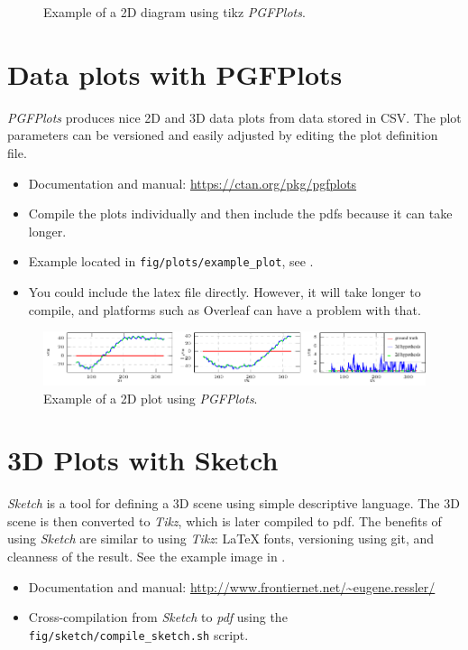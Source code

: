 \begin{figure}[htbp]
  \centering

  \begin{adjustbox}{max totalsize={0.6\textwidth}{0.90\textheight}, center}
    
  \end{adjustbox}

  \caption{Example of a 2D diagram using tikz \emph{PGFPlots}.}
  \label{fig:pgfplots_diagram}
\end{figure}

\section{Data plots with PGFPlots}

\emph{PGFPlots} produces nice 2D and 3D data plots from data stored in CSV.
The plot parameters can be versioned and easily adjusted by editing the plot definition file.
\begin{itemize}
  \item Documentation and manual: \url{https://ctan.org/pkg/pgfplots}
  \item Compile the plots individually and then include the pdfs because it can take longer.
  \item Example located in \texttt{fig/plots/example\_plot}, see .
  \item You could include the latex file directly. However, it will take longer to compile, and platforms such as Overleaf can have a problem with that.
\end{itemize}

\begin{figure}[htbp]
  \centering
  \includegraphics[width=1.0\textwidth]{./fig/plots/example_plot/hypotheses.pdf}
  \caption{Example of a 2D plot using \emph{PGFPlots}.}
  \label{fig:pgfplots_data}
\end{figure}

\section{3D Plots with Sketch}

\emph{Sketch} is a tool for defining a 3D scene using simple descriptive language.
The 3D scene is then converted to \emph{Tikz}, which is later compiled to pdf.
The benefits of using \emph{Sketch} are similar to using \emph{Tikz}: LaTeX fonts, versioning using git, and cleanness of the result.
See the example image in .
\begin{itemize}
  \item Documentation and manual: \url{http://www.frontiernet.net/~eugene.ressler/}
  \item Cross-compilation from \emph{Sketch} to \emph{pdf} using the \texttt{fig/sketch/compile\_sketch.sh} script.
\end{itemize}

